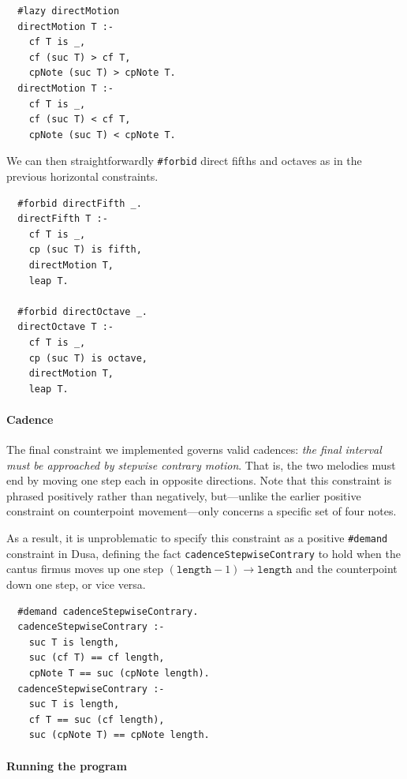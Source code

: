 \begin{verbatim}
  #lazy directMotion
  directMotion T :-
    cf T is _,
    cf (suc T) > cf T,
    cpNote (suc T) > cpNote T.
  directMotion T :-
    cf T is _,
    cf (suc T) < cf T,
    cpNote (suc T) < cpNote T.
\end{verbatim}

We can then straightforwardly \verb|#forbid| direct fifths and octaves as in the previous horizontal constraints.

\begin{verbatim}
  #forbid directFifth _.
  directFifth T :-
    cf T is _,
    cp (suc T) is fifth,
    directMotion T,
    leap T.

  #forbid directOctave _.
  directOctave T :-
    cf T is _,
    cp (suc T) is octave,
    directMotion T,
    leap T.
\end{verbatim}



\paragraph{Cadence}

The final constraint we implemented governs valid cadences: \emph{the final interval must be approached by stepwise contrary motion}. That is, the two melodies must end by moving one step each in opposite directions. Note that this constraint is phrased positively rather than negatively, but---unlike the earlier positive constraint on counterpoint movement---only concerns a specific set of four notes.

As a result, it is unproblematic to specify this constraint as a positive \verb|#demand| constraint in Dusa, defining the fact \verb|cadenceStepwiseContrary| to hold when the cantus firmus moves up one step $(\mathtt{length}-1)\to\mathtt{length}$ and the counterpoint down one step, or vice versa.

\begin{verbatim}
  #demand cadenceStepwiseContrary.
  cadenceStepwiseContrary :-
    suc T is length,
    suc (cf T) == cf length,
    cpNote T == suc (cpNote length).
  cadenceStepwiseContrary :-
    suc T is length,
    cf T == suc (cf length),
    suc (cpNote T) == cpNote length.
\end{verbatim}

\paragraph{Running the program}


